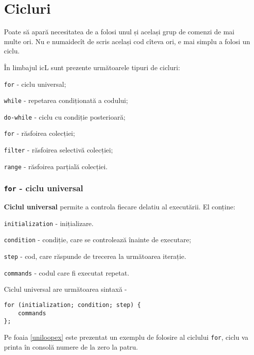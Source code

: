 \section{Cicluri}

Poate să apară necesitatea de a folosi unul și același grup de comenzi de mai multe ori. Nu e numaidecît de scris același cod cîteva ori, e mai simplu a folosi un ciclu.

În limbajul icL sunt prezente următoarele tipuri de cicluri:

\begin{icItems}
\item
	\texttt{for} - ciclu universal;
\item
	\texttt{while} - repetarea condiționată a codului;
\item
	\texttt{do-while} - ciclu cu condiție posterioară;
\item
	\texttt{for} - răsfoirea colecției;
\item
	\texttt{filter} - răsfoirea selectivă colecției;
\item
	\texttt{range} - răsfoirea parțială colecției.
\end{icItems}


\subsubsection{\texttt{for} - ciclu universal}

{\bf Ciclul universal} permite a controla fiecare delatiu al executării. El conține:

\begin{icItems}
\item
	\texttt{initialization} - inițializare.
\item
	\texttt{condition} - condiție, care se controlează înainte de executare;
\item
	\texttt{step} - cod, care răspunde de trecerea la următoarea iterație.
\item
	\texttt{commands} - codul care fi executat repetat.
\end{icItems}

Ciclul universal are următoarea sintaxă -
\begin{verbatim}
for (initialization; condition; step) {
	commands
};
\end{verbatim}

Pe foaia \ref{uniloopex} este prezentat un exemplu de folosire al ciclului \texttt{for}, ciclu va printa în consolă numere de la zero la patru.


